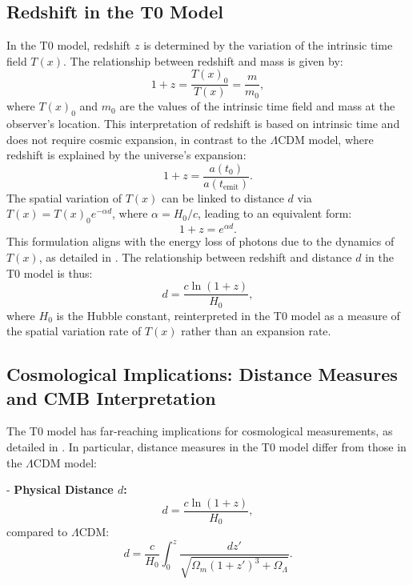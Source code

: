 \documentclass[12pt,a4paper]{article}
\newcommand{\Tfield}{T(x)}
\begin{document}
	\subsection{Redshift in the T0 Model}
	In the T0 model, redshift \( z \) is determined by the variation of the intrinsic time field \( \Tfield \). The relationship between redshift and mass is given by:
	\begin{equation}
		1 + z = \frac{\Tfield_0}{\Tfield} = \frac{m}{m_0},
	\end{equation}
	where \( \Tfield_0 \) and \( m_0 \) are the values of the intrinsic time field and mass at the observer’s location. This interpretation of redshift is based on intrinsic time and does not require cosmic expansion, in contrast to the \(\Lambda\)CDM model, where redshift is explained by the universe’s expansion:
	\begin{equation}
		1 + z = \frac{a(t_0)}{a(t_{\text{emit}})}.
	\end{equation}
	The spatial variation of \( \Tfield \) can be linked to distance \( d \) via \( \Tfield = \Tfield_0 e^{-\alpha d} \), where \( \alpha = H_0/c \), leading to an equivalent form:
	\begin{equation}
		1 + z = e^{\alpha d}.
	\end{equation}
	This formulation aligns with the energy loss of photons due to the dynamics of \( \Tfield \), as detailed in \cite{pascher_messdifferenzen_2025}. The relationship between redshift and distance \( d \) in the T0 model is thus:
	\begin{equation}
		d = \frac{c \ln(1 + z)}{H_0},
	\end{equation}
	where \( H_0 \) is the Hubble constant, reinterpreted in the T0 model as a measure of the spatial variation rate of \( \Tfield \) rather than an expansion rate.
	
	\subsection{Cosmological Implications: Distance Measures and CMB Interpretation}
	The T0 model has far-reaching implications for cosmological measurements, as detailed in \cite{pascher_messdifferenzen_2025}. In particular, distance measures in the T0 model differ from those in the \(\Lambda\)CDM model:
	
	- \textbf{Physical Distance \( d \):}
	\[
	d = \frac{c \ln(1 + z)}{H_0},
	\]
	compared to \(\Lambda\)CDM:
	\[
	d = \frac{c}{H_0} \int_0^z \frac{dz'}{\sqrt{\Omega_m (1 + z')^3 + \Omega_\Lambda}}.
	\]
	
\end{document}
